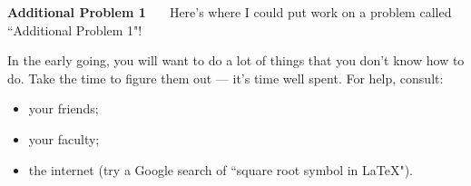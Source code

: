 \documentclass[10pt]{article}
\begin{document}
\bigskip
\noindent
{\bf Additional Problem 1 \ \ } Here's where I could put work on a problem called ``Additional Problem 1"!

\bigskip
\noindent
In the early going, you will want to do a lot of things that you don't know how to do.  Take the time to figure them out --- it's time well spent.  For help, consult:

\begin{itemize}
\item your friends;
\item your faculty;
\item the internet (try a Google search of ``square root symbol in LaTeX").
\end{itemize}
\end{document}
